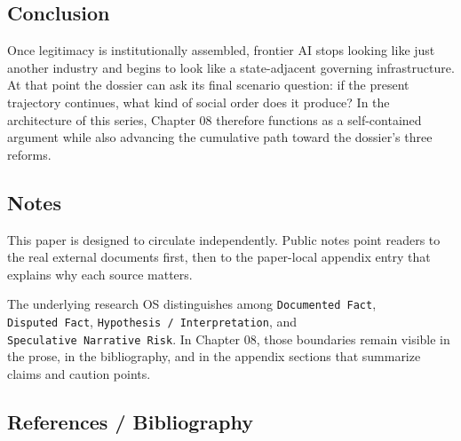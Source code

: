 \documentclass[
  american,
  11pt,
  letterpaper,
]{article}
\begin{document}
\subsection{Conclusion}\label{conclusion}

Once legitimacy is institutionally assembled, frontier AI stops looking
like just another industry and begins to look like a state-adjacent
governing infrastructure. At that point the dossier can ask its final
scenario question: if the present trajectory continues, what kind of
social order does it produce? In the architecture of this series,
Chapter 08 therefore functions as a self-contained argument while also
advancing the cumulative path toward the dossier's three reforms.

\subsection{Notes}\label{notes}

This paper is designed to circulate independently. Public notes point
readers to the real external documents first, then to the paper-local
appendix entry that explains why each source matters.

The underlying research OS distinguishes among
\texttt{Documented\ Fact}, \texttt{Disputed\ Fact},
\texttt{Hypothesis\ /\ Interpretation}, and
\texttt{Speculative\ Narrative\ Risk}. In Chapter 08, those boundaries
remain visible in the prose, in the bibliography, and in the appendix
sections that summarize claims and caution points.

\subsection{References / Bibliography}\label{references-bibliography}
\end{document}

